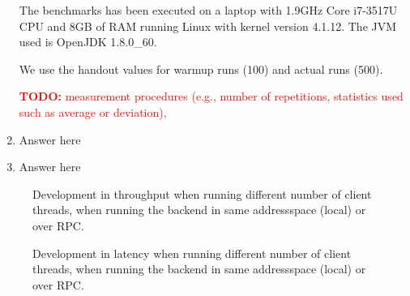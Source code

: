 \documentclass[11pt,a4paper,english]{article}
\newcommand{\todo}[1]{\textcolor{red}{\textbf{TODO: }#1}}
\begin{document}
\begin{enumerate}
  The benchmarks has been executed on a laptop with 1.9GHz Core i7-3517U CPU and
  8GB of RAM running Linux with kernel version 4.1.12. The JVM used is OpenJDK
  1.8.0\_60.

  We use the handout values for warmup runs (100) and actual runs (500).

  \todo{measurement procedures (e.g., number of repetitions, statistics used such as average or deviation),}

\item Answer here

\item Answer here
\end{enumerate}


\begin{figure}
  \centering
  \caption{Development in throughput when running different number of
    client threads, when running the backend in same addressspace (local) or
    over RPC.}
  \label{fig:throughput}
\end{figure}

\begin{figure}
  \centering
  \caption{Development in latency when running different number of
    client threads, when running the backend in same addressspace (local) or
    over RPC.}
  \label{fig:latency}
\end{figure}
\end{document}
